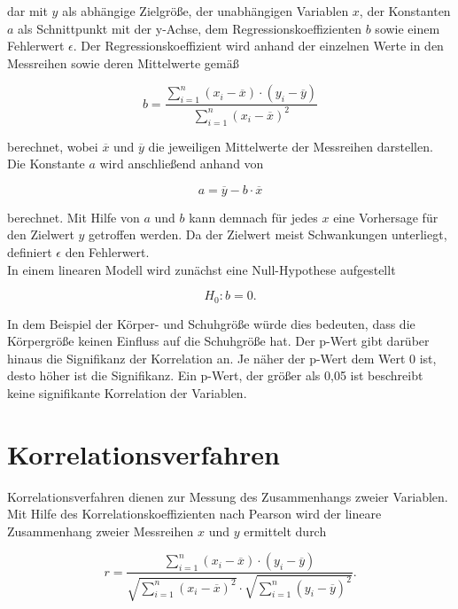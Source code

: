dar mit $y$ als abhängige Zielgröße, der unabhängigen Variablen $x$, der Konstanten $a$ als Schnittpunkt mit der y-Achse, dem Regressionskoeffizienten $b$ sowie einem Fehlerwert $\epsilon$. Der Regressionskoeffizient wird anhand der einzelnen Werte in den Messreihen sowie deren Mittelwerte gemäß

\begin{equation}
b = \frac{\sum \limits_{i=1}^n(x_i-\overline{x}) \cdot (y_i-\overline{y})}{\sum \limits_{i=1}^n(x_i-\overline{x})^2} 
	\label{eq:regcoef}
\end{equation}

berechnet, wobei $\overline{x}$ und $\overline{y}$ die jeweiligen Mittelwerte der Messreihen darstellen. Die Konstante $a$ wird anschließend anhand von 

\begin{equation}
a = \overline{y} - b \cdot \overline{x}
	\label{eq:konstante}
\end{equation}

berechnet. Mit Hilfe von $a$ und $b$ kann demnach für jedes $x$ eine Vorhersage für den Zielwert $y$ getroffen werden. Da der Zielwert meist Schwankungen unterliegt, definiert $\epsilon$ den Fehlerwert. \parencite{frank_einfach_2006}\\

In einem linearen Modell wird zunächst eine Null-Hypothese aufgestellt 

\begin{equation}
H_0: b = 0.
	\label{eq:null-hypo}
\end{equation}

In dem Beispiel der Körper- und Schuhgröße würde dies bedeuten, dass die Körpergröße keinen Einfluss auf die Schuhgröße hat. Der p-Wert gibt darüber hinaus die Signifikanz der Korrelation an. Je näher der p-Wert dem Wert 0 ist, desto höher ist die Signifikanz. Ein p-Wert, der größer als 0,05 ist beschreibt keine signifikante Korrelation der Variablen.  

\section{Korrelationsverfahren}

Korrelationsverfahren dienen zur Messung des Zusammenhangs zweier Variablen. Mit Hilfe des Korrelationskoeffizienten nach Pearson wird der lineare Zusammenhang zweier Messreihen $x$ und $y$ ermittelt durch

\begin{equation}
r =  \frac{\sum \limits_{i=1}^n (x_i-\overline{x}) \cdot (y_i-\overline{y})}{\sqrt{\sum \limits_{i=1}^n (x_i-\overline{x})^2} \cdot \sqrt{\sum \limits_{i=1}^n (y_i-\overline{y})^2}}.
	\label{eq:pearson}
\end{equation}

